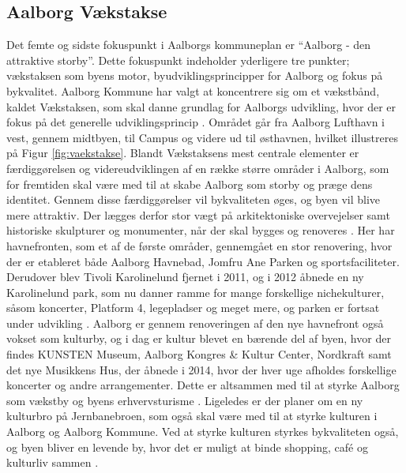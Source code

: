 \subsection{Aalborg Vækstakse}
Det femte og sidste fokuspunkt i Aalborgs kommuneplan er “Aalborg - den attraktive storby”. Dette fokuspunkt indeholder yderligere tre punkter; vækstaksen som byens motor, byudviklingsprincipper for Aalborg og fokus på bykvalitet. 
\newline
\newline
Aalborg Kommune har valgt at koncentrere sig om et vækstbånd, kaldet Vækstaksen, som skal danne grundlag for Aalborgs udvikling, hvor der er fokus på det generelle udviklingsprincip \citep{kommuneplan3}. Området går fra Aalborg Lufthavn i vest, gennem midtbyen, til Campus og videre ud til østhavnen, hvilket illustreres på Figur \ref{fig:vaekstakse}. 
\newline \indent{     }  Blandt Vækstaksens mest centrale elementer er færdiggørelsen og videreudviklingen af en række større områder i Aalborg, som for fremtiden skal være med til at skabe Aalborg som storby og præge dens identitet. Gennem disse færdiggørelser vil bykvaliteten øges, og byen vil blive mere attraktiv. Der lægges derfor stor vægt på arkitektoniske overvejelser samt historiske skulpturer og monumenter, når der skal bygges og renoveres \citep{kommuneplan3}. 
\newline \indent{     }  Her har havnefronten, som et af de første områder, gennemgået en stor renovering, hvor der er etableret både Aalborg Havnebad, Jomfru Ane Parken og sportsfaciliteter. Derudover blev Tivoli Karolinelund fjernet i 2011, og i 2012 åbnede en ny Karolinelund park, som nu danner ramme for mange forskellige nichekulturer, såsom koncerter, Platform 4, legepladser og meget mere, og parken er fortsat under udvikling \citep{jomfruaneparken} \citep{karolinelund}. 
\newline \indent{     }  Aalborg er gennem renoveringen af den nye havnefront også vokset som kulturby, og i dag er kultur blevet en bærende del af byen, hvor der findes KUNSTEN Museum, Aalborg Kongres \& Kultur Center, Nordkraft samt det nye Musikkens Hus, der åbnede i 2014, hvor der hver uge afholdes forskellige koncerter og andre arrangementer. Dette er altsammen med til at styrke Aalborg som vækstby og byens erhvervsturisme \citep{kommuneplan3}. Ligeledes er der planer om en ny kulturbro på Jernbanebroen, som også skal være med til at styrke kulturen i Aalborg og Aalborg Kommune. Ved at styrke kulturen styrkes bykvaliteten også, og byen bliver en levende by, hvor det er muligt at binde shopping, café og kulturliv sammen \citep{kulturbro} \citep{musikkenshus}.
